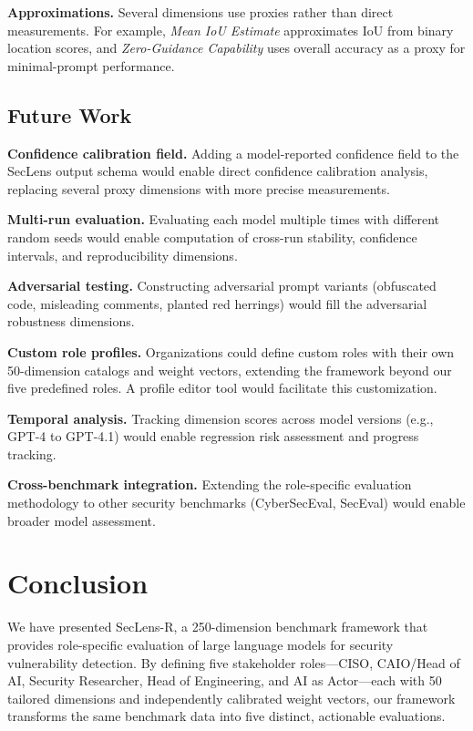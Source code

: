 \documentclass[10pt,twocolumn]{article}
\newcommand{\framework}{SecLens-R\xspace}
\newcommand{\seclens}{SecLens\xspace}
\begin{document}
\textbf{Approximations.} Several dimensions use proxies rather than direct measurements. For example, \emph{Mean IoU Estimate} approximates IoU from binary location scores, and \emph{Zero-Guidance Capability} uses overall accuracy as a proxy for minimal-prompt performance.

\subsection{Future Work}

\textbf{Confidence calibration field.} Adding a model-reported confidence field to the \seclens output schema would enable direct confidence calibration analysis, replacing several proxy dimensions with more precise measurements.

\textbf{Multi-run evaluation.} Evaluating each model multiple times with different random seeds would enable computation of cross-run stability, confidence intervals, and reproducibility dimensions.

\textbf{Adversarial testing.} Constructing adversarial prompt variants (obfuscated code, misleading comments, planted red herrings) would fill the adversarial robustness dimensions.

\textbf{Custom role profiles.} Organizations could define custom roles with their own 50-dimension catalogs and weight vectors, extending the framework beyond our five predefined roles. A profile editor tool would facilitate this customization.

\textbf{Temporal analysis.} Tracking dimension scores across model versions (e.g., GPT-4 to GPT-4.1) would enable regression risk assessment and progress tracking.

\textbf{Cross-benchmark integration.} Extending the role-specific evaluation methodology to other security benchmarks (CyberSecEval, SecEval) would enable broader model assessment.

\section{Conclusion}
\label{sec:conclusion}

We have presented \framework, a 250-dimension benchmark framework that provides role-specific evaluation of large language models for security vulnerability detection. By defining five stakeholder roles---CISO, CAIO/Head of AI, Security Researcher, Head of Engineering, and AI as Actor---each with 50 tailored dimensions and independently calibrated weight vectors, our framework transforms the same benchmark data into five distinct, actionable evaluations.
\end{document}
